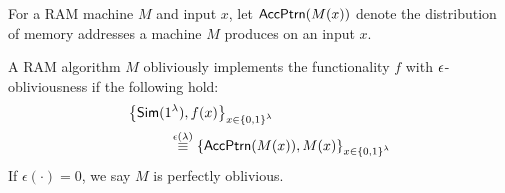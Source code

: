 For a  RAM machine $M$ and input $x$, let ${\sf AccPtrn}(M(x))$ denote the distribution of memory addresses a machine $M$ produces on an input $x$.
\begin{definition}
A RAM algorithm $M$ obliviously implements the functionality $f$ with ${\epsilon}$-obliviousness if the following hold:
\begin{eqnarray*}
\hspace{-5ex}\lefteqn{\left\{\Sim(1^\lambda),f(x)\right\}_{x \in \bit^\lambda}} \\
&&\hspace{+5ex}\overset{\epsilon(\lambda)}{\equiv} \left\{ {\sf AccPtrn}(M(x)),M(x)\right\}_{x \in \bit^\lambda}
\end{eqnarray*}
If $\epsilon(\cdot)=0$, we say $M$ is perfectly oblivious. 
\end{definition}

%
%

